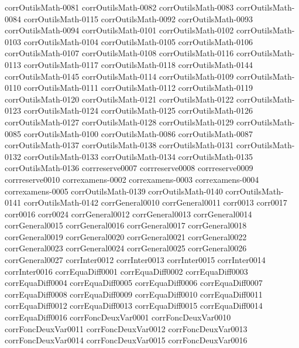 {corrOutilsMath-0081}
{corrOutilsMath-0082}
{corrOutilsMath-0083}
{corrOutilsMath-0084}
{corrOutilsMath-0115}
{corrOutilsMath-0092}
{corrOutilsMath-0093}
{corrOutilsMath-0094}
{corrOutilsMath-0101}
{corrOutilsMath-0102}
{corrOutilsMath-0103}
{corrOutilsMath-0104}
{corrOutilsMath-0105}
{corrOutilsMath-0106}
{corrOutilsMath-0107}
{corrOutilsMath-0108}
{corrOutilsMath-0116}
{corrOutilsMath-0113}
{corrOutilsMath-0117}
{corrOutilsMath-0118}
{corrOutilsMath-0144}
{corrOutilsMath-0145}
{corrOutilsMath-0114}
{corrOutilsMath-0109}
{corrOutilsMath-0110}
{corrOutilsMath-0111}
{corrOutilsMath-0112}
{corrOutilsMath-0119}
{corrOutilsMath-0120}
{corrOutilsMath-0121}
{corrOutilsMath-0122}
{corrOutilsMath-0123}
{corrOutilsMath-0124}
{corrOutilsMath-0125}
{corrOutilsMath-0126}
{corrOutilsMath-0127}
{corrOutilsMath-0128}
{corrOutilsMath-0129}
{corrOutilsMath-0085}
{corrOutilsMath-0100}
{corrOutilsMath-0086}
{corrOutilsMath-0087}
{corrOutilsMath-0137}
{corrOutilsMath-0138}
{corrOutilsMath-0131}
{corrOutilsMath-0132}
{corrOutilsMath-0133}
{corrOutilsMath-0134}
{corrOutilsMath-0135}
{corrOutilsMath-0136}
{corrreserve0007}
{corrreserve0008}
{corrreserve0009}
{corrreserve0010}
{correxamens-0002}
{correxamens-0003}
{correxamens-0004}
{correxamens-0005}
{corrOutilsMath-0139}
{corrOutilsMath-0140}
{corrOutilsMath-0141}
{corrOutilsMath-0142}
{corrGeneral0010}
{corrGeneral0011}
{corr0013}
{corr0017}
{corr0016}
{corr0024}
{corrGeneral0012}
{corrGeneral0013}
{corrGeneral0014}
{corrGeneral0015}
{corrGeneral0016}
{corrGeneral0017}
{corrGeneral0018}
{corrGeneral0019}
{corrGeneral0020}
{corrGeneral0021}
{corrGeneral0022}
{corrGeneral0023}
{corrGeneral0024}
{corrGeneral0025}
{corrGeneral0026}
{corrGeneral0027}
{corrInter0012}
{corrInter0013}
{corrInter0015}
{corrInter0014}
{corrInter0016}
{corrEquaDiff0001}
{corrEquaDiff0002}
{corrEquaDiff0003}
{corrEquaDiff0004}
{corrEquaDiff0005}
{corrEquaDiff0006}
{corrEquaDiff0007}
{corrEquaDiff0008}
{corrEquaDiff0009}
{corrEquaDiff0010}
{corrEquaDiff0011}
{corrEquaDiff0012}
{corrEquaDiff0013}
{corrEquaDiff0015}
{corrEquaDiff0014}
{corrEquaDiff0016}
{corrFoncDeuxVar0001}
{corrFoncDeuxVar0010}
{corrFoncDeuxVar0011}
{corrFoncDeuxVar0012}
{corrFoncDeuxVar0013}
{corrFoncDeuxVar0014}
{corrFoncDeuxVar0015}
{corrFoncDeuxVar0016}
